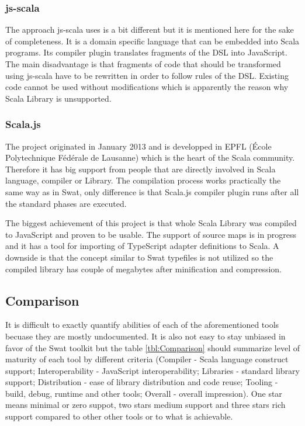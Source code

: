 \documentclass[12pt,a4paper]{report}
\begin{document}
\subsubsection*{js-scala}

The approach js-scala uses is a bit different but it is mentioned here for the sake of completeness. It is a domain specific language that can be embedded into Scala programs. Its compiler plugin translates fragments of the DSL into JavaScript. The main disadvantage is that fragments of code that should be transformed using js-scala have to be rewritten in order to follow rules of the DSL. Existing code cannot be used without modifications which is apparently the reason why Scala Library is unsupported.

\subsubsection*{Scala.js}

The project originated in January 2013 and is developped in EPFL (École Polytechnique Fédérale de Lausanne) which is the heart of the Scala community. Therefore it has big support from people that are directly involved in Scala language, compiler or Library. The compilation process works practically the same way as in Swat, only difference is that Scala.js compiler plugin runs after all the standard phases are executed.

The biggest achievement of this project is that whole Scala Library was compiled to JavaScript and proven to be usable. The support of source maps is in progress and it has a tool for importing of TypeScript adapter definitions to Scala. A downside is that the concept similar to Swat typefiles is not utilized so the compiled library has couple of megabytes after minification and compression.

\subsection{Comparison}

It is difficult to exactly quantify abilities of each of the aforementioned tools becuase they are mostly undocumented. It is also not easy to stay unbiased in favor of the Swat toolkit but the table \ref{tbl:Comparison} should summarize level of maturity of each tool by different criteria (Compiler - Scala language construct support; Interoperability - JavaScript interoperability; Libraries - standard library support; Distribution - ease of library distribution and code reuse; Tooling - build, debug, runtime and other tools; Overall - overall impression). One star means minimal or zero suppot, two stars medium support and three stars rich support compared to other other tools or to what is achievable.
\end{document}
